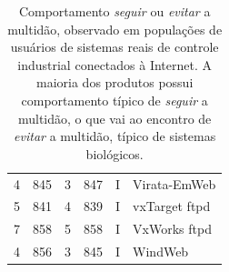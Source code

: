 \begin{table}[!htb]
\begin{tabular}{|c|c|c|c|c|l|}
			\hspace*{-0.15cm} 4	& \hspace*{-0.15cm} 845	& \hspace*{-0.15cm} 3	& \hspace*{-0.15cm} 847	& \hspace*{-0.15cm} I	& \hspace*{-0.15cm} Virata-EmWeb	 \\
			\hspace*{-0.15cm} 5	& \hspace*{-0.15cm} 841	& \hspace*{-0.15cm} 4	& \hspace*{-0.15cm} 839	& \hspace*{-0.15cm} I	& \hspace*{-0.15cm} vxTarget ftpd	 \\
			\hspace*{-0.15cm} 7	& \hspace*{-0.15cm} 858	& \hspace*{-0.15cm} 5	& \hspace*{-0.15cm} 858	& \hspace*{-0.15cm} I	& \hspace*{-0.15cm} VxWorks ftpd	 \\
			\hspace*{-0.15cm} 4	& \hspace*{-0.15cm} 856	& \hspace*{-0.15cm} 3	& \hspace*{-0.15cm} 845	& \hspace*{-0.15cm} I	& \hspace*{-0.15cm} WindWeb	 \\
		\hline 	
		\end{tabular}
		\caption{Comportamento   \textit{seguir} ou \textit{evitar} a multidão, observado em populações de usuários de sistemas reais de controle industrial conectados à Internet. A maioria dos produtos possui comportamento típico de \textit{seguir} a multidão, o que vai ao encontro de \textit{evitar} a multidão, típico de sistemas biológicos.}
		\label{tab:shodam}
	\end{table}	

